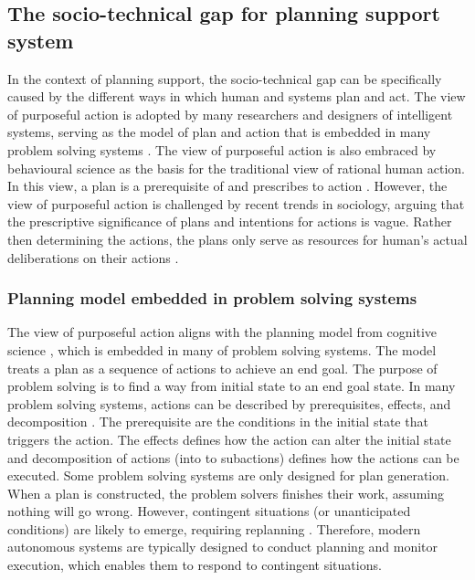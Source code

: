 \subsection{The socio-technical gap for planning support system}
In the context of planning support, the socio-technical gap can be specifically caused by the different ways in which human and systems plan and act. The view of purposeful action is adopted by many researchers and designers of intelligent systems, serving as the model of plan and action that is embedded in many problem solving systems \citep{Allen1984}. The view of purposeful action is also embraced by behavioural science as the basis for the traditional view of rational human action.  In this view, a plan is a prerequisite of and prescribes to action  \citep{Suchman1987}. However, the view of purposeful action is challenged by recent trends in sociology, arguing that the prescriptive significance of plans and intentions for actions is vague. Rather then determining the actions, the plans only serve as resources for human's actual deliberations on their actions \citep{Suchman1987}.\\  

\subsubsection{Planning model embedded in problem solving systems }
The view of purposeful action aligns with the planning model from cognitive science \citep{Suchman1987}, which is embedded in many of problem solving systems. The model treats a plan as a sequence of actions to achieve an end goal. The purpose of problem solving is to find a way from initial state to an end goal state. In many problem solving systems, actions can be described by prerequisites, effects, and decomposition \citep{Allen1984}. The prerequisite are the conditions in the initial state that triggers the action. The effects defines how the action can alter the initial state and decomposition of actions (into to subactions) defines how the actions can be executed. Some problem solving systems are only designed for plan generation. When a plan is constructed, the problem solvers finishes their work, assuming nothing will go wrong. However, contingent situations (or unanticipated conditions) are likely to emerge, requiring replanning \citep{Suchman1987}. Therefore, modern autonomous systems are typically designed to conduct planning and monitor execution, which enables them to respond to contingent situations.\\

